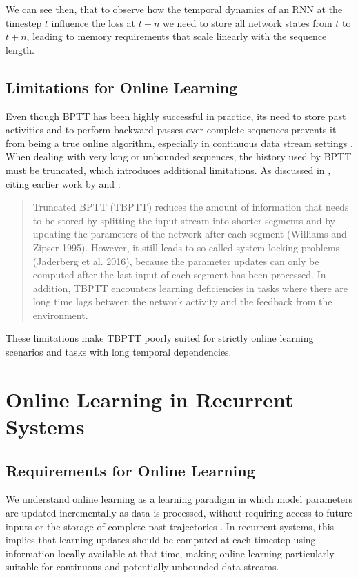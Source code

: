 We can see then, that to observe how the temporal dynamics of an RNN at the timestep $t$ influence the loss at $t+n$ we need to store all network states from $t$ to $t+n$, leading to memory requirements that scale linearly with the sequence length.

\subsection{Limitations for Online Learning}

Even though BPTT has been highly successful in practice, its need to store past activities and to perform backward passes over complete sequences prevents it from being a true online algorithm, especially in continuous data stream settings \citep{OSTL}. When dealing with very long or unbounded sequences, the history used by BPTT must be truncated, which introduces additional limitations. As discussed in \citet{OSTL}, citing earlier work by
\citet{WilliamsZipser1995} and \citet{Jaderberg2016}:

\begin{quote}
Truncated BPTT (TBPTT) reduces the amount of information that needs to be stored by splitting the input stream
into shorter segments and by updating the parameters of the
network after each segment (Williams and Zipser 1995).
However, it still leads to so-called system-locking problems (Jaderberg et al. 2016), because the parameter updates
can only be computed after the last input of each segment
has been processed. In addition, TBPTT encounters learning
deficiencies in tasks where there are long time lags between
the network activity and the feedback from the environment.
\end{quote}

These limitations make TBPTT poorly suited for strictly online learning scenarios and tasks with long temporal dependencies.

\section{Online Learning in Recurrent Systems}

\subsection{Requirements for Online Learning}

We understand online learning as a learning paradigm in which model
parameters are updated incrementally as data is processed, without
requiring access to future inputs or the storage of complete past
trajectories \citep{eprop2020, UORO}. In recurrent systems, this implies that learning updates should be computed at each timestep using information locally available at that time, making online learning particularly suitable for continuous and potentially unbounded data streams.

